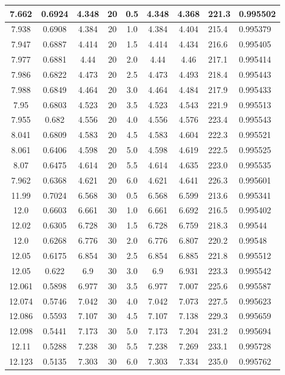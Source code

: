 \documentclass[12pt]{article}
\begin{document}
\begin{table}[H]
{\begin{tabular}{|c|c|c|c|c|c|c|p{2cm}|p{2cm}|}
7.662 & 0.6924 & 4.348 & 20 & 0.5 & 4.348 & 4.368 & 221.3 & 0.995502 \\
\hline
7.938 & 0.6908 & 4.384 & 20 & 1.0 & 4.384 & 4.404 & 215.4 & 0.995379 \\
\hline
7.947 & 0.6887 & 4.414 & 20 & 1.5 & 4.414 & 4.434 & 216.6 & 0.995405 \\
\hline
7.977 & 0.6881 & 4.44 & 20 & 2.0 & 4.44 & 4.46 & 217.1 & 0.995414 \\
\hline
7.986 & 0.6822 & 4.473 & 20 & 2.5 & 4.473 & 4.493 & 218.4 & 0.995443 \\
\hline
7.988 & 0.6849 & 4.464 & 20 & 3.0 & 4.464 & 4.484 & 217.9 & 0.995433 \\
\hline
7.95 & 0.6803 & 4.523 & 20 & 3.5 & 4.523 & 4.543 & 221.9 & 0.995513 \\
\hline
7.955 & 0.682 & 4.556 & 20 & 4.0 & 4.556 & 4.576 & 223.4 & 0.995543 \\
\hline
8.041 & 0.6809 & 4.583 & 20 & 4.5 & 4.583 & 4.604 & 222.3 & 0.995521 \\
\hline
8.061 & 0.6406 & 4.598 & 20 & 5.0 & 4.598 & 4.619 & 222.5 & 0.995525 \\
\hline
8.07 & 0.6475 & 4.614 & 20 & 5.5 & 4.614 & 4.635 & 223.0 & 0.995535 \\
\hline
7.962 & 0.6368 & 4.621 & 20 & 6.0 & 4.621 & 4.641 & 226.3 & 0.995601 \\
\hline

11.99 & 0.7024 & 6.568 & 30 & 0.5 & 6.568 & 6.599 & 213.6 & 0.995341 \\
\hline
12.0 & 0.6603 & 6.661 & 30 & 1.0 & 6.661 & 6.692 & 216.5 & 0.995402 \\
\hline
12.02 & 0.6305 & 6.728 & 30 & 1.5 & 6.728 & 6.759 & 218.3 & 0.99544 \\
\hline
12.0 & 0.6268 & 6.776 & 30 & 2.0 & 6.776 & 6.807 & 220.2 & 0.99548 \\
\hline
12.05 & 0.6175 & 6.854 & 30 & 2.5 & 6.854 & 6.885 & 221.8 & 0.995512 \\
\hline
12.05 & 0.622 & 6.9 & 30 & 3.0 & 6.9 & 6.931 & 223.3 & 0.995542 \\
\hline
12.061 & 0.5898 & 6.977 & 30 & 3.5 & 6.977 & 7.007 & 225.6 & 0.995587 \\
\hline
12.074 & 0.5746 & 7.042 & 30 & 4.0 & 7.042 & 7.073 & 227.5 & 0.995623 \\
\hline
12.086 & 0.5593 & 7.107 & 30 & 4.5 & 7.107 & 7.138 & 229.3 & 0.995659 \\
\hline
12.098 & 0.5441 & 7.173 & 30 & 5.0 & 7.173 & 7.204 & 231.2 & 0.995694 \\
\hline
12.11 & 0.5288 & 7.238 & 30 & 5.5 & 7.238 & 7.269 & 233.1 & 0.995728 \\
\hline
12.123 & 0.5135 & 7.303 & 30 & 6.0 & 7.303 & 7.334 & 235.0 & 0.995762 \\
\hline
\end{tabular}%
}
\end{table}
\end{document}
